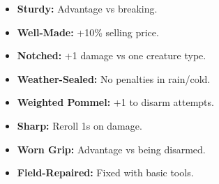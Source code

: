 \documentclass[10pt,twoside]{article}
\begin{document}
\begin{minipage}[t]{0.48\textwidth}
\begin{itemize}[leftmargin=0.3cm, itemsep=0.1cm]
\item \textcolor{commoncolor}{\textbf{Sturdy:}} \textcolor{commoncolor}{Advantage vs breaking.}
\item \textcolor{commoncolor}{\textbf{Well-Made:}} \textcolor{commoncolor}{+10\% selling price.}
\item \textcolor{commoncolor}{\textbf{Notched:}} \textcolor{commoncolor}{+1 damage vs one creature type.}
\item \textcolor{commoncolor}{\textbf{Weather-Sealed:}} \textcolor{commoncolor}{No penalties in rain/cold.}
\item \textcolor{commoncolor}{\textbf{Weighted Pommel:}} \textcolor{commoncolor}{+1 to disarm attempts.}
\item \textcolor{commoncolor}{\textbf{Sharp:}} \textcolor{commoncolor}{Reroll 1s on damage.}
\item \textcolor{commoncolor}{\textbf{Worn Grip:}} \textcolor{commoncolor}{Advantage vs being disarmed.}
\item \textcolor{commoncolor}{\textbf{Field-Repaired:}} \textcolor{commoncolor}{Fixed with basic tools.}
\end{itemize}
\end{minipage}

\vspace{0.5cm}

\end{document}
